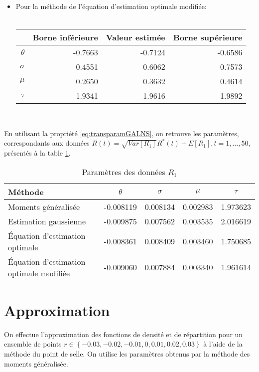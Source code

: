 \begin{itemize}
\item Pour la méthode de l'équation d'estimation optimale modifiée:\\ \\
  \begin{tabular}{rrrr}
    \hline
    & \textbf{Borne inférieure} & \textbf{Valeur estimée} & \textbf{Borne supérieure} \\
    \hline
    $\theta$ & -0.7663 & -0.7124 & -0.6586 \\ 
    $\sigma$ & 0.4551 & 0.6062 & 0.7573 \\ 
    $\mu$ & 0.2650 & 0.3632 & 0.4614 \\ 
    $\tau$ & 1.9341 & 1.9616 & 1.9892 \\ 
    \hline
  \end{tabular} \\
\end{itemize}

En utilisant la propriété \eqref{eq:transparamGALNS}, on retrouve les
paramètres, correspondants aux données $R(t)= \sqrt{Var[R_1]} R^{*}(t)
+ E[R_1], t=1,\ldots,50$, présentés à la table
\ref{tab:parametresdonneesorigineR1}.

\begin{table}[!ht] \centering
  \begin{tabular}{lcccc}
    \hline
    \textbf{Méthode} & $\theta$ & $\sigma$ & $\mu$ & $\tau$ \\ 
    \hline
    Moments généralisée& -0.008119 & 0.008134 & 0.002983 & 1.973623 \\ 
    Estimation gaussienne& -0.009875 & 0.007562 & 0.003535 & 2.016619 \\   
    Équation d'estimation optimale& -0.008361 & 0.008409 & 0.003460 & 1.750685 \\ 
    Équation d'estimation optimale modifiée& -0.009060 & 0.007884 & 0.003340 & 1.961614 \\ 
    \hline
  \end{tabular}
  \caption{Paramètres des données $R_1$}
  \label{tab:parametresdonneesorigineR1}
\end{table}

\section{Approximation}
\label{sec:approximationR1}

On effectue l'approximation des fonctions de densité et de répartition
pour un ensemble de points $r \in
\left\{-0.03,-0.02,-0.01,0,0.01,0.02,0.03 \right\}$ à l'aide de la
méthode du point de selle. On utilise les paramètres obtenus par la
méthode des moments généralisée.

